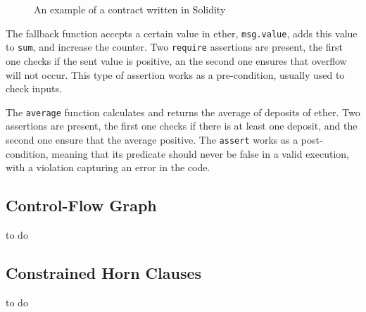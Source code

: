 \begin{figure}

\caption{An example of a contract written in Solidity}
\label{fig:contractC}
\end{figure}

The fallback function accepts a certain value in ether, \texttt{msg.value}, adds this value to \texttt{sum}, and increase the counter. Two \texttt{require} assertions are present, the first one checks if the sent value is positive, an the second one ensures that overflow will not occur. This type of assertion works as a pre-condition, usually used to check inputs.

The \texttt{average} function calculates and returns the average of deposits of ether. Two assertions are present, the first one checks if there is at least one deposit, and the second one ensure that the average positive. The \texttt{assert} works as a post-condition, meaning that its predicate should never be false in a valid execution, with a violation capturing an error in the code.


\subsection{Control-Flow Graph} \label{sec:background_cfg}

to do


\subsection{Constrained Horn Clauses} \label{sec:background_chc}

to do